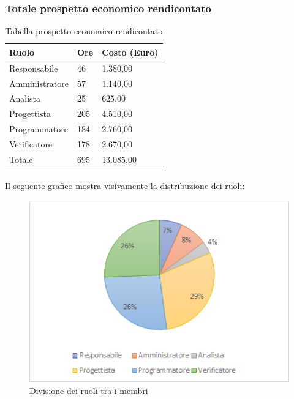 \subsubsection{Totale prospetto economico rendicontato}
\begin{center}
	\renewcommand{\arraystretch}{1.5}
	\begin{longtable}[H]{  p{5.6cm}  p{3cm} p{3cm}  }
		\rowcolor{tableHeadYellow}
		\textbf{Ruolo}   & \textbf{Ore} & \textbf{Costo (Euro)} \\ 
		\endhead
		Responsabile   & 46    & 1.380,00 \\
		Amministratore & 57    & 1.140,00 \\
		Analista       & 25    & 625,00 \\
		Progettista    & 205   & 4.510,00 \\
		Programmatore  & 184   & 2.760,00 \\
		Verificatore   & 178   & 2.670,00 \\
		Totale         & 695   & 13.085,00 \\
		\rowcolor{white}
		\caption{Tabella prospetto economico rendicontato}
	\end{longtable}
\end{center}
Il seguente grafico mostra visivamente la distribuzione dei ruoli:
\begin{figure}[H]
	\centering
	\includegraphics[width=15cm,keepaspectratio]{../includes/pics/grafici/grafico12.png}
	\caption{\label{fig:mission}Divisione dei ruoli tra i membri}
\end{figure}
